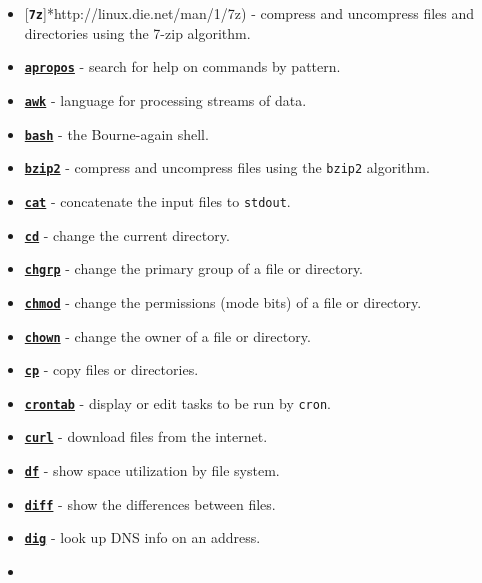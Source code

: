 \documentclass[10pt,]{book}
\numberwithin{figure}{chapter}
\begin{document}
\begin{itemize}
\itemsep1pt\parskip0pt
\item
  {[}\textbf{\texttt{7z}}{]}*http://linux.die.net/man/1/7z) - compress
  and uncompress files and directories using the 7-zip algorithm.
\item
  \href{http://linux.die.net/man/1/apropos}{\textbf{\texttt{apropos}}} -
  search for help on commands by pattern.
\item
  \href{http://linux.die.net/man/1/awk}{\textbf{\texttt{awk}}} -
  language for processing streams of data.
\item
  \href{http://linux.die.net/man/1/bash}{\textbf{\texttt{bash}}} - the
  Bourne-again shell.
\item
  \href{http://linux.die.net/man/1/bzip2}{\textbf{\texttt{bzip2}}} -
  compress and uncompress files using the \texttt{bzip2} algorithm.
\item
  \href{linux.die.net/man/1/cat}{\textbf{\texttt{cat}}} - concatenate
  the input files to \texttt{stdout}.
\item
  \href{linux.die.net/man/1/cd}{\textbf{\texttt{cd}}} - change the
  current directory.
\item
  \href{linux.die.net/man/1/chgrp}{\textbf{\texttt{chgrp}}} - change the
  primary group of a file or directory.
\item
  \href{linux.die.net/man/1/chmod}{\textbf{\texttt{chmod}}} - change the
  permissions (mode bits) of a file or directory.
\item
  \href{linux.die.net/man/1/chown}{\textbf{\texttt{chown}}} - change the
  owner of a file or directory.
\item
  \href{linux.die.net/man/1/cp}{\textbf{\texttt{cp}}} - copy files or
  directories.
\item
  \href{linux.die.net/man/1/crontab}{\textbf{\texttt{crontab}}} -
  display or edit tasks to be run by \texttt{cron}.
\item
  \href{http://linux.die.net/man/1/curl}{\textbf{\texttt{curl}}} -
  download files from the internet.
\item
  \href{http://linux.die.net/man/1/df}{\textbf{\texttt{df}}} - show
  space utilization by file system.
\item
  \href{linux.die.net/man/1/diff}{\textbf{\texttt{diff}}} - show the
  differences between files.
\item
  \href{http://linux.die.net/man/1/dig}{\textbf{\texttt{dig}}} - look up
  DNS info on an address.
\item

\end{itemize}
\end{document}
